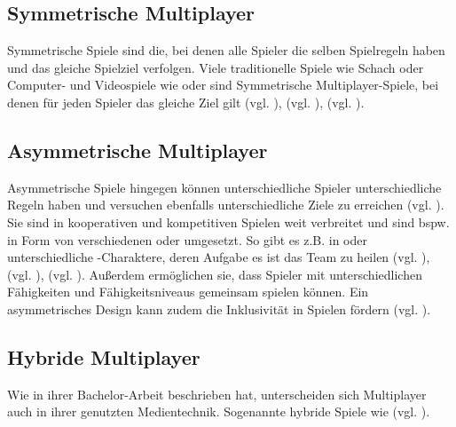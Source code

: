 \subsection{Symmetrische Multiplayer}
Symmetrische Spiele sind die, bei denen alle Spieler die selben Spielregeln haben und das gleiche Spielziel verfolgen. Viele traditionelle Spiele wie Schach oder Computer- und Videospiele wie  oder  sind Symmetrische Multiplayer-Spiele, bei denen für jeden Spieler das gleiche Ziel gilt (vgl. \cite[S. 12]{adams_fundamentals_2013}), (vgl. \cite{noauthor_mario_nodate}), (vgl. \cite{noauthor_willkommen_nodate}). 


\subsection{Asymmetrische Multiplayer}
Asymmetrische Spiele hingegen können unterschiedliche Spieler unterschiedliche Regeln haben und versuchen ebenfalls unterschiedliche Ziele zu erreichen (vgl. \cite[S. 12]{adams_fundamentals_2013}). Sie sind in kooperativen und kompetitiven Spielen weit verbreitet und sind bspw. in Form von verschiedenen  oder  umgesetzt. So gibt es z.B. in  oder   unterschiedliche -Charaktere, deren Aufgabe es ist das Team zu heilen (vgl. \cite{smilovitch_birdquestvr_2019}), (vgl. \cite{noauthor_league_2025}), (vgl. \cite{noauthor_overwatch_nodate}). 
Außerdem ermöglichen sie, dass Spieler mit unterschiedlichen Fähigkeiten und Fähigkeitsniveaus gemeinsam spielen können. Ein asymmetrisches Design kann zudem die Inklusivität in Spielen fördern (vgl. \cite{smilovitch_birdquestvr_2019}).

\subsection{Hybride Multiplayer}


Wie \cite[S. 6f]{lotz_konzeption_2021} in ihrer Bachelor-Arbeit beschrieben hat, unterscheiden sich Multiplayer auch in ihrer genutzten Medientechnik. Sogenannte hybride Spiele wie  (vgl. \cite{noauthor_mario_nodate-1}).


